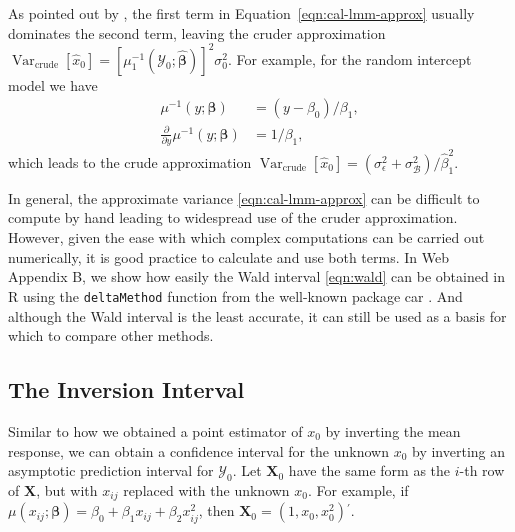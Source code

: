 \documentclass[useAMS,usenatbib,usegraphicx,referee]{biom}\usepackage[]{graphicx}\usepackage[]{color}
\newcommand{\var}{\operatorname{Var}}
\newcommand{\trans}{\ensuremath{^\prime}}
\newcommand{\code}[1]{\texttt{#1}}
\newcommand{\proglang}[1]{\textsf{#1}}
\newcommand{\pkg}[1]{{\fontseries{b}\selectfont #1}}
\newcommand{\X}{\ensuremath{\bm{X}}}
\begin{document}
As pointed out by \citet[p. 283]{davidian_nonlinear_1995}, the first term in Equation~\eqref{eqn:cal-lmm-approx} usually dominates the second term, leaving the cruder approximation $\var_\text{crude}\left[\widehat{x}_0\right] = [\mu_1^{-1}(\mathscr{Y}_0; \widehat{\bm{\beta}})]^2\sigma_0^2$. For example, for the random intercept model we have
\begin{align*}
  \mu^{-1}\left(y; \bm{\beta}\right) &= \left(y - \beta_0\right)/\beta_1, \\
  \frac{\partial}{\partial y}\mu^{-1}\left(y; \bm{\beta}\right) &= 1/\beta_1,
\end{align*}
which leads to the crude approximation $\var_\text{crude}\left[\widehat{x}_0\right] = \left(\sigma_\epsilon^2 + \sigma_\mathscr{B}^2\right)/\widehat{\beta}_1^2$.

In general, the approximate variance \eqref{eqn:cal-lmm-approx} can be difficult to compute by hand leading to widespread use of the cruder approximation. However, given the ease with which complex computations can be carried out numerically, it is good practice to calculate and use both terms. In Web Appendix B, we show how easily the Wald interval \eqref{eqn:wald} can be obtained in \proglang{R} using the \code{deltaMethod} function from the well-known package \pkg{car} \citep{fox_r_2011}. And although the Wald interval is the least accurate, it can still be used as a basis for which to compare other methods.

\subsection{The Inversion Interval}
\label{sec:inversion}
Similar to how we obtained a point estimator of $x_0$ by inverting the mean response, we can obtain a confidence interval for the unknown $x_0$ by inverting an asymptotic prediction interval for $\mathscr{Y}_0$. Let $\X_0$ have the same form as the $i$-th row of $\X$, but with $x_{ij}$ replaced with the unknown $x_0$. For example, if $\mu\left(x_{ij}; \bm{\beta}\right) = \beta_0 + \beta_1 x_{ij} + \beta_2 x_{ij}^2$, then $\X_0 = \left(1, x_0, x_0^2\right)\trans$. 
\end{document}
